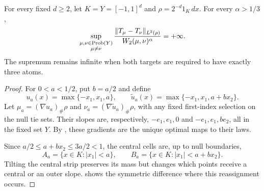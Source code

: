 \begin{proposition}\label{sharpness:exponent}
For every fixed $d\ge2$, let $K=Y=[-1,1]^d$ and
$\rho=2^{-d}1_K\,dx$.  For every $\alpha>1/3$,
\[
 \sup_{\substack{\mu,\nu\in\operatorname{Prob}(Y)\\ \mu\ne\nu}}
 \frac{\|T_\mu-T_\nu\|_{L^2(\rho)}}{W_2(\mu,\nu)^\alpha}
 =+\infty.
\]
The supremum remains infinite when both targets are required to have
exactly three atoms.
\end{proposition}

\begin{proof}
For $0<a<1/2$, put $b=a/2$ and define
\begin{equation}\label{sharpness:potentials}
 u_a(x)=\max\{-x_1,x_1,a\},\qquad
 \widetilde u_a(x)=\max\{-x_1,x_1,a+bx_2\}.
\end{equation}
Let $\mu_a=(\nabla u_a)_\#\rho$ and
$\nu_a=(\nabla\widetilde u_a)_\#\rho$, with any fixed first-index
selection on the null tie sets.  Their slopes are, respectively,
$-e_1,e_1,0$ and $-e_1,e_1,be_2$, all in the fixed set $Y$.
By , these gradients are the unique optimal
maps to their laws.

Since $a/2\le a+bx_2\le3a/2<1$, the central cells are, up to null
boundaries,
\[
 A_a=\{x\in K:|x_1|<a\},\qquad
 B_a=\{x\in K:|x_1|<a+bx_2\}.
\]
Tilting the central strip preserves its mass but changes which points
receive a central or an outer slope.  shows
the symmetric difference where this reassignment occurs.


\end{proof}
